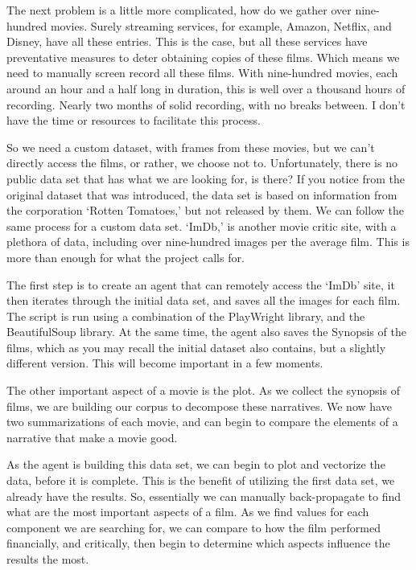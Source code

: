 \documentclass[conference]{IEEEtran}
\begin{document}
The next problem is a little more complicated, how do we gather over nine-hundred movies. Surely streaming services, for example, Amazon, Netflix, and Disney, have all these entries. This is the case, but all these services have preventative measures to deter obtaining copies of these films. Which means we need to manually screen record all these films. With nine-hundred movies, each around an hour and a half long in duration, this is well over a thousand hours of recording. Nearly two months of solid recording, with no breaks between. I don’t have the time or resources to facilitate this process.

So we need a custom dataset, with frames from these movies, but we can’t directly access the films, or rather, we choose not to. Unfortunately, there is no public data set that has what we are looking for, is there? If you notice from the original dataset that was introduced, the data set is based on information from the corporation ‘Rotten Tomatoes,’ but not released by them. We can follow the same process for a custom data set. ‘ImDb,’ is another movie critic site, with a plethora of data, including over nine-hundred images per the average film. This is more than enough for what the project calls for.

The first step is to create an agent that can remotely access the ‘ImDb’ site, it then iterates through the initial data set, and saves all the images for each film. The script is run using a combination of the PlayWright library, and the BeautifulSoup library. At the same time, the agent also saves the Synopsis of the films, which as you may recall the initial dataset also contains, but a slightly different version. This will become important in a few moments.


The other important aspect of a movie is the plot. As we collect the synopsis of films, we are building our corpus to decompose these narratives. We now have two summarizations of each movie, and can begin to compare the elements of a narrative that make a movie good.

As the agent is building this data set, we can begin to plot and vectorize the data, before it is complete. This is the benefit of utilizing the first data set, we already have the results. So, essentially we can manually back-propagate to find what are the most important aspects of a film. As we find values for each component we are searching for, we can compare to how the film performed financially, and critically, then begin to determine which aspects influence the results the most.
\end{document}
